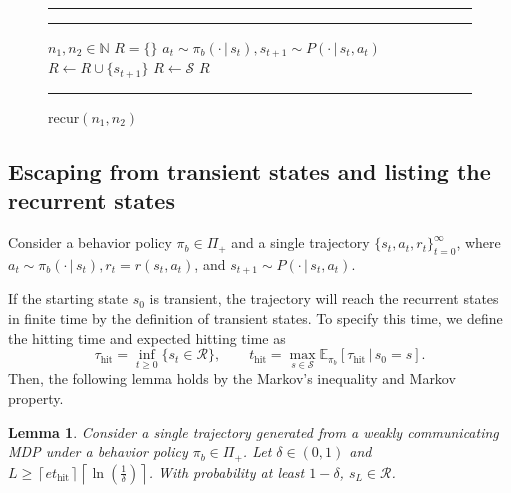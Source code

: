 \documentclass{article}
\newtheorem{lemma}[theorem]{Lemma}
\theoremstyle{definition}
\theoremstyle{remark}
\newcommand{\expec}{\mathbb{E}}
\newcommand{\cS}{\mathcal{S}}
\newcommand{\cR}{\mathcal{R}}
\begin{document}
\begin{figure}
\vspace{-.15in}
\captionsetup{type=algorithm}
\hrule
\vspace{2pt}
\begin{minipage}{0.42\textwidth}
\caption{\mbox{\sc recur}$(n_1,n_2)$}
\label{alg:rec}
\vspace{-.1in}
\hrule
\begin{algorithmic}
   $n_1, n_2 \in \mathbb{N}$
   $R =\{\}$
    \State $a_t \sim \pi_b(\cdot \,|\, s_{t}), s_{t+1} \sim P(\cdot \,|\, s_t,a_t)$
    \State $R \gets R \cup \{s_{t+1}\}$
    \EndIf
    \EndFor
      \State $R \gets \cS$
    \EndIf
  $R$
\end{algorithmic}
\hrule
\end{minipage}
\vspace{-.2in}
\end{figure}

\subsection{Escaping from transient states and listing the recurrent states}

Consider a behavior policy $\pi_b \in \Pi_+$ and a single trajectory $ \{s_t, a_t,r_t\}^\infty_{t=0}$, where $a_t \sim \pi_b(\cdot \,|\, s_t), r_t=r(s_t,a_t)$, and $s_{t+1} \sim P(\cdot \,|\, s_t,a_t)$. 

If the starting state $s_0$ is transient, the trajectory will reach the recurrent states in finite time by the definition of transient states. To specify this time, we define the hitting time and expected hitting time as 
\[
\tau_{\mathrm{hit}} = \inf_{t \ge 0} \{s_t \in \cR\}, 
\qquad 
t_{\mathrm{hit}}= \max_{s\in \cS} \expec_{\pi_b}[\tau_{\mathrm{hit}} \,|\, s_0=s ].
\] 
Then, the following lemma holds by the Markov's inequality and Markov property.
\begin{lemma}\label{lem:hit}
 Consider a single trajectory generated from a weakly communicating MDP under a behavior policy $\pi_b \in \Pi_+$. 
Let  $ \delta \in (0,1)$ and $L \ge  \left\lceil e t_{\mathrm{hit}} \right\rceil\left\lceil\ln\!\left(\frac{1}{\delta}\right) \right\rceil$. With probability at least $1-\delta$, $s_L \in \mathcal{R}$.
\end{lemma} 
\end{document}
